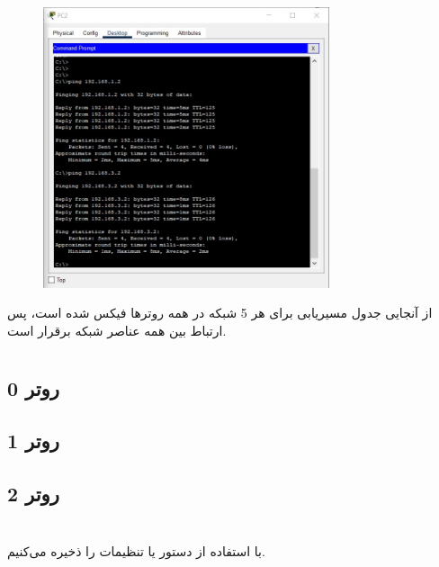 \documentclass{article}
\begin{document}
\begin{figure}[H]
    \centering
    \includegraphics[width=0.75\textwidth]{figures/27.jpg}
    \caption{}
    \label{fig:fig1}
\end{figure}
از آنجایی جدول مسیریابی برای هر 5 شبکه در همه روترها فیکس شده است، پس ارتباط بین همه عناصر شبکه برقرار است.
\section{}%

\subsection{روتر 0}
\begin{latin}
\end{latin}
\subsection{روتر 1}
\begin{latin}
\end{latin}
\subsection{روتر 2}
\begin{latin}
\end{latin}

\section{}%
با استفاده از دستور  یا  تنظیمات را ذخیره می‌کنیم.
\end{document}
